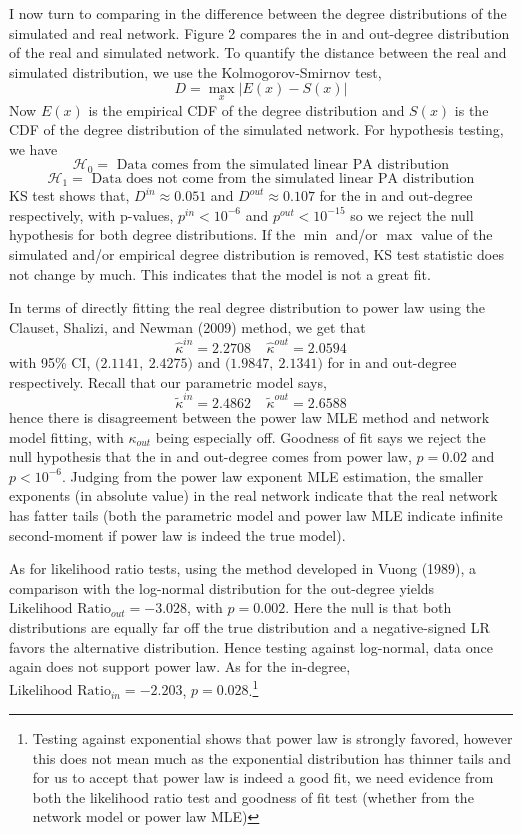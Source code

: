 \documentclass[]{elsarticle} %
\begin{document}
I now turn to comparing in the difference between the degree
distributions of the simulated and real network. Figure 2 compares the
in and out-degree distribution of the real and simulated network. To
quantify the distance between the real and simulated distribution, we
use the Kolmogorov-Smirnov test, \[
D = \max_{x}| E(x) - S(x) |
\] Now \(E(x)\) is the empirical CDF of the degree distribution and
\(S(x)\) is the CDF of the degree distribution of the simulated network.
For hypothesis testing, we have
\[\mathcal{H}_0 = \text{ Data comes from the simulated linear PA distribution}\]
\[\mathcal{H}_1 = \text{ Data does not come from the simulated linear PA distribution}\]
KS test shows that, \(D^{in} \approx 0.051\) and
\(D^{out} \approx 0.107\) for the in and out-degree respectively, with
p-values, \(p^{in} < 10^{-6}\) and \(p^{out} < 10^{-15}\) so we reject
the null hypothesis for both degree distributions. If the \(\min\)
and/or \(\max\) value of the simulated and/or empirical degree
distribution is removed, KS test statistic does not change by much. This
indicates that the model is not a great fit.

In terms of directly fitting the real degree distribution to power law
using the Clauset, Shalizi, and Newman (2009) method, we get that \[
\hat{\kappa}^{in} = 2.2708 \ \ \ \ \ \hat{\kappa}^{out} = 2.0594
\] with 95\% CI, \(\big(2.1141, \ 2.4275 \big)\) and
\(\big(1.9847, \  2.1341\big)\) for in and out-degree respectively.
Recall that our parametric model says,
\[\tilde{\kappa}^{in} = 2.4862 \ \ \ \ \ \tilde{\kappa}^{out} = 2.6588\]
hence there is disagreement between the power law MLE method and network
model fitting, with \(\kappa_{out}\) being especially off. Goodness of
fit says we reject the null hypothesis that the in and out-degree comes
from power law, \(p=0.02\) and \(p < 10^{-6}\). Judging from the power
law exponent MLE estimation, the smaller exponents (in absolute value)
in the real network indicate that the real network has fatter tails
(both the parametric model and power law MLE indicate infinite
second-moment if power law is indeed the true model).

As for likelihood ratio tests, using the method developed in Vuong
(1989), a comparison with the log-normal distribution for the out-degree
yields \(\text{Likelihood Ratio}_{out} = -3.028\), with \(p = 0.002\).
Here the null is that both distributions are equally far off the true
distribution and a negative-signed LR favors the alternative
distribution. Hence testing against log-normal, data once again does not
support power law. As for the in-degree,
\(\text{Likelihood Ratio}_{in} = -2.203\), \(p = 0.028\).\footnote{Testing
  against exponential shows that power law is strongly favored, however
  this does not mean much as the exponential distribution has thinner
  tails and for us to accept that power law is indeed a good fit, we
  need evidence from both the likelihood ratio test and goodness of fit
  test (whether from the network model or power law MLE)}
\end{document}
